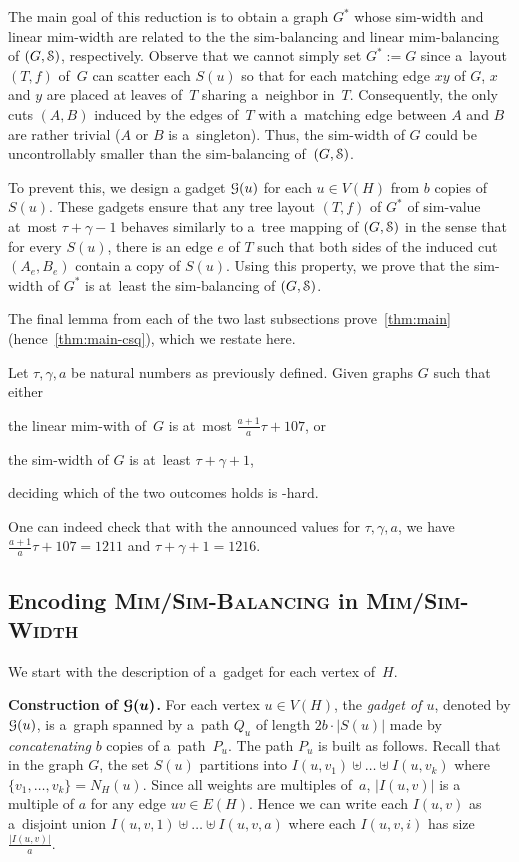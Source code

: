 \documentclass[a4paper,UKenglish,cleveref,hyperref,autoref]{lipics-v2021}
\begin{document}
The main goal of this reduction is to obtain a graph $G^*$ whose sim-width and linear mim-width are related to the the sim-balancing and linear mim-balancing of $(G,\cal S)$, respectively.
Observe that we cannot simply set $G^*:=G$ since a~layout $(T,f)$ of~$G$ can scatter each $S(u)$ so that for each matching edge $xy$ of $G$, $x$ and $y$ are placed at leaves of~$T$ sharing a~neighbor in~$T$.
Consequently, the only cuts $(A,B)$ induced by the edges of~$T$ with a~matching edge between $A$ and $B$ are rather trivial ($A$ or $B$ is a~singleton).
Thus, the sim-width of $G$ could be uncontrollably smaller than the sim-balancing of~$(G,\cal S)$. 

To prevent this, we design a gadget $\mathcal G(u)$ for each $u\in V(H)$ from $b$ copies of $S(u)$.
These gadgets ensure that any tree layout $(T,f)$ of $G^*$ of sim-value at~most $\tau+\gamma-1$ behaves similarly to a~tree mapping of $(G,\cal S)$ in the sense that for every $S(u)$, there is an edge $e$ of $T$ such that both sides of the induced cut $(A_e, B_e)$ contain a copy of $S(u)$. 
Using this property, we prove that the sim-width of $G^*$ is at~least the sim-balancing of $(G,\cal S)$.

The final lemma from each of the two last subsections prove~\cref{thm:main} (hence~\cref{thm:main-csq}), which we restate here.
\begin{theorem}
  Let $\tau, \gamma, a$ be natural numbers as previously defined.
  Given graphs $G$ such that either 
  \begin{compactitem}
  \item the linear mim-with of~$G$ is at~most $\frac{a+1}{a}\tau + 107$, or
  \item the sim-width of $G$ is at~least $\tau + \gamma + 1$,
  \end{compactitem}
  deciding which of the two outcomes holds is \NP-hard.
\end{theorem}
One can indeed check that with the announced values for $\tau, \gamma, a$, we have $\frac{a+1}{a}\tau + 107=1211$ and $\tau + \gamma + 1=1216$.

\subsection{Encoding \textsc{Mim/Sim-Balancing} in \textsc{Mim/Sim-Width}}

We start with the description of a~gadget for each vertex of~$H$.

\medskip

\textbf{Construction of $\bm{\mathcal G(u)}$.}
For each vertex $u \in V(H)$, the \emph{gadget of $u$}, denoted by $\mathcal G(u)$, is a~graph spanned by a~path $Q_u$ of length $2b \cdot |S(u)|$ made by \emph{concatenating} $b$ copies of a~path~$P_u$.
The path $P_u$ is built as follows.
Recall that in the graph $G$, the set $S(u)$ partitions into $I(u, v_1) \uplus \dots \uplus I(u, v_k)$ where $\{v_1, \dots, v_k\} = N_H(u)$.
Since all weights are multiples of~$a$, $|I(u, v)|$ is a multiple of $a$ for any edge $uv \in E(H)$.
Hence we can write each $I(u, v)$ as a~disjoint union $I(u, v, 1) \uplus \dots \uplus I(u, v, a)$ where each $I(u, v, i)$ has size $\frac{|I(u, v)|}{a}$.
\end{document}
